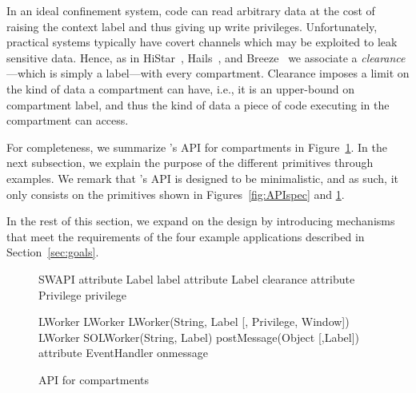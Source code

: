 In an ideal confinement system, code can read arbitrary data at the
cost of raising the context label and thus giving up write privileges.
%
Unfortunately, practical systems typically have covert channels which
may be exploited to leak sensitive data.
%
Hence, as in HiStar~\cite{Zeldovich:2006}, Hails~\cite{giffin:2012:hails}, and
Breeze~\cite{Breeze13} we associate a \emph{clearance}---which is
simply a label---with every compartment.
%
Clearance imposes a limit on the kind of data a compartment can have,
i.e., it is an upper-bound on compartment label, and thus the kind of
data a piece of code executing in the compartment can access.

For completeness, we summarize  \sys{}'s API for compartments
in Figure~\ref{systemAPI}. In the next subsection, 
we explain the purpose of the different primitives through examples. 
We remark that \sys{}'s API is designed to be minimalistic, and as such, it only
consists on the primitives shown in Figures~\ref{fig:APIspec} and
\ref{systemAPI}.

In the rest of this section, we expand on the \sys{} design by
introducing mechanisms that meet the requirements of the four
example applications described in Section~\ref{sec:goals}.
%


\begin{figure}
{\small
\begin{webidl}
SWAPI {
  attribute Label label
  attribute Label clearance 
  attribute Privilege privilege
}
\end{webidl}
\begin{webidl}
LWorker {
  LWorker LWorker(String, Label
                  [, Privilege, Window])
  LWorker SOLWorker(String, Label)
  postMessage(Object [,Label])
  attribute EventHandler onmessage
}
\end{webidl}
}
\vspace{-10pt}
\caption{\label{systemAPI} API for compartments}
\vspace{-10pt}
\end{figure}


